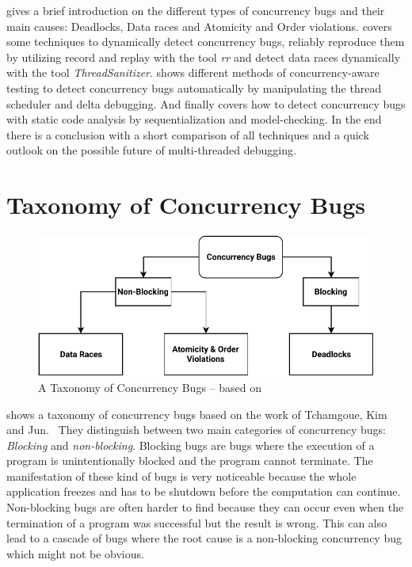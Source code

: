 \documentclass[conference]{IEEEtran}
\begin{document}
 gives a brief introduction on the different types of concurrency bugs and their main causes: Deadlocks, Data races and Atomicity and Order violations.
 covers some techniques to dynamically detect concurrency bugs, reliably reproduce them by utilizing record and replay with the tool \emph{rr} and detect data races dynamically with the tool \emph{ThreadSanitizer}.
 shows different methods of concurrency-aware testing to detect concurrency bugs automatically by manipulating the thread scheduler and delta debugging.
And  finally covers how to detect concurrency bugs with static code analysis by sequentialization and model-checking.
In the end there is a conclusion with a short comparison of all techniques and a quick outlook on the possible future of multi-threaded debugging.


\section{Taxonomy of Concurrency Bugs}
\label{sct:taxonomy}

\begin{figure}
    \includegraphics[width=\linewidth]{figures/ConcurrencyBugClasses.pdf}
    \caption{A Taxonomy of Concurrency Bugs -- based on\cite{tchamgoue2012testing}}
    \label{fig:classes}
\end{figure}

 shows a taxonomy of concurrency bugs based on the work of Tchamgoue, Kim and Jun.~\cite{tchamgoue2012testing}
They distinguish between two main categories of concurrency bugs: \emph{Blocking} and \emph{non-blocking}.
Blocking bugs are bugs where the execution of a program is unintentionally blocked and the program cannot terminate.
The manifestation of these kind of bugs is very noticeable because the whole application freezes and has to be shutdown before the computation can continue.
Non-blocking bugs are often harder to find because they can occur even when the termination of a program was successful but the result is wrong.
This can also lead to a cascade of bugs where the root cause is a non-blocking concurrency bug which might not be obvious.
\end{document}
